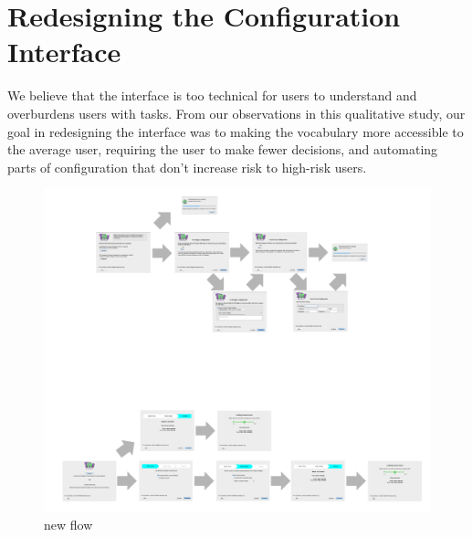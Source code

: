 \documentclass{template}
\begin{document}

\section{Redesigning the Configuration Interface}
We believe that the interface is too technical for users to understand and overburdens users with tasks. From our observations in this qualitative study, our goal in redesigning the interface was to making the vocabulary more accessible to the average user, requiring the user to make fewer decisions, and automating parts of configuration that don't increase risk to high-risk users. 

\begin{figure}[t]
	\centering
		\includegraphics[width=1.0\textwidth]{new-flow.pdf} 
		\caption{new flow} 
\end{figure} 
\end{document}

